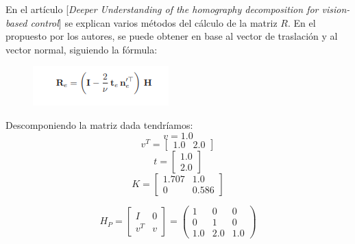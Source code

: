 \documentclass[11pt]{scrartcl} %
\begin{document}
En el artículo [\emph{Deeper Understanding of the homography decomposition for
vision-based control}] se explican varios métodos del cálculo de la matriz $R$.
En el propuesto por los autores, se puede obtener en base al vector de traslación
y al vector normal, siguiendo la fórmula:

\begin{figure}[h]
	\centering
	\includegraphics[width=0.35\columnwidth]{9.png}
\end{figure}

\newpage



Descomponiendo la matriz dada tendríamos:
\begin{equation}
	v = 1.0
\end{equation}
\begin{equation}
	v^{T} = \begin{bmatrix}1.0 & 2.0\end{bmatrix}
\end{equation}
\begin{equation}
	t = \begin{bmatrix}1.0 \\ 2.0\end{bmatrix}
\end{equation}
\begin{equation}
	K = \begin{bmatrix}1.707 & 1.0 \\ 0 & 0.586\end{bmatrix}
\end{equation}

\begin{equation}
H_{P} = \begin{bmatrix}I & 0 \\ v^{T} & v\end{bmatrix} = 
\left( 
	\begin{array}{c}1 \\ 0 \\ 1.0\end{array} 
	\begin{array}{c}0 \\ 1 \\ 2.0\end{array} 
	\begin{array}{c}0 \\ 0 \\ 1.0\end{array} 
\right)
\end{equation}
\end{document}
